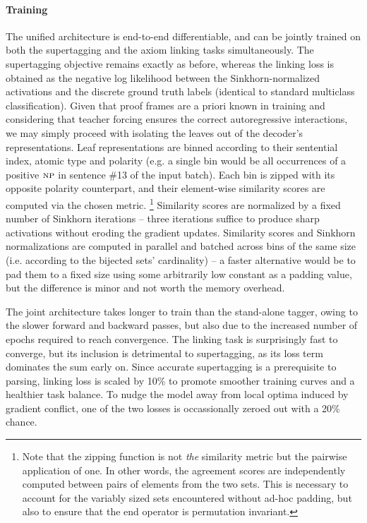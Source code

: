 \paragraph{Training}
The unified architecture is end-to-end differentiable, and can be jointly trained on both the supertagging and the axiom linking tasks simultaneously.
The supertagging objective remains exactly as before, whereas the linking loss is obtained as the negative log likelihood between the Sinkhorn-normalized activations and the discrete ground truth labels (identical to standard multiclass classification).
Given that proof frames are a priori known in training and considering that teacher forcing ensures the correct autoregressive interactions, we may simply proceed with isolating the leaves out of the decoder's representations.
Leaf representations are binned according to their sentential index, atomic type and polarity (e.g. a single bin would be all occurrences of a positive $\np[s]$ in sentence \#13 of the input batch).
Each bin is zipped with its opposite polarity counterpart, and their element-wise similarity scores are computed via the chosen metric.%
	\footnote{Note that the zipping function is not \textit{the} similarity metric but the pairwise application of one. 
	In other words, the agreement scores are independently computed between pairs of elements from the two sets.
	This is necessary to account for the variably sized sets encountered without ad-hoc padding, but also to ensure that the end operator is permutation invariant.}
Similarity scores are normalized by a fixed number of Sinkhorn iterations -- three iterations suffice to produce sharp activations without eroding the gradient updates.
Similarity scores and Sinkhorn normalizations are computed in parallel and batched across bins of the same size (i.e. according to the bijected sets' cardinality) -- a faster alternative would be to pad them to a fixed size using some arbitrarily low constant as a padding value, but the difference is minor and not worth the memory overhead. 

The joint architecture takes longer to train than the stand-alone tagger, owing to the slower forward and backward passes, but also due to the increased number of epochs required to reach convergence.
The linking task is surprisingly fast to converge, but its inclusion is detrimental to supertagging, as its loss term dominates the sum early on.
Since accurate supertagging is a prerequisite to parsing, linking loss is scaled by 10\% to promote smoother training curves and a healthier task balance.
To nudge the model away from local optima induced by gradient conflict, one of the two losses is occassionally zeroed out with a 20\% chance.


